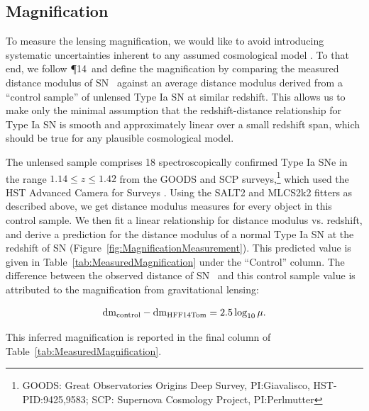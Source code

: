 \subsection{Magnification}
\label{sec:Magnification}

To measure the lensing magnification, we would like to avoid
introducing systematic uncertainties inherent to any assumed
cosmological model \citep[e.g.][]{Nordin:2014}.  To that end, we
follow \P14\ and define the magnification by comparing
the measured distance modulus of SN \tomas\ against an average
distance modulus derived from a ``control sample'' of unlensed Type Ia
SN at similar redshift.  This allows us to make only the minimal
assumption that the redshift-distance relationship for Type Ia SN is
smooth and approximately linear over a small redshift span, which
should be true for any plausible cosmological model.

The unlensed sample comprises 18 spectroscopically confirmed Type Ia
SNe in the range $1.14\leq z \leq1.42$ from the GOODS and SCP
surveys,\footnote{GOODS: Great Observatories Origins Deep Survey,
PI:Giavalisco, HST-PID:9425,9583; SCP: Supernova Cosmology Project,
PI:Perlmutter} which used the HST Advanced Camera for
Surveys \citep{Riess:2006,Suzuki:2012}.  Using the SALT2 and MLCS2k2
fitters as described above, we get distance modulus measures for every
object in this control sample.  We then fit a linear relationship for
distance modulus vs. redshift, and derive a prediction for the
distance modulus of a normal Type Ia SN at the redshift of SN \tomas
(Figure~\ref{fig:MagnificationMeasurement}).
This predicted value is given in
Table~\ref{tab:MeasuredMagnification} under the ``Control'' column.
The difference between the observed distance of SN \tomas\ and this
control sample value is attributed to the magnification from
gravitational lensing:

\begin{equation} \label{eqn:mu}
{\rm dm}_{\rm control} - {\rm dm}_{\rm HFF14Tom} = 2.5 \log_{10}\mu.
\end{equation}

\noindent This inferred magnification is reported in the final column of
Table~\ref{tab:MeasuredMagnification}.

